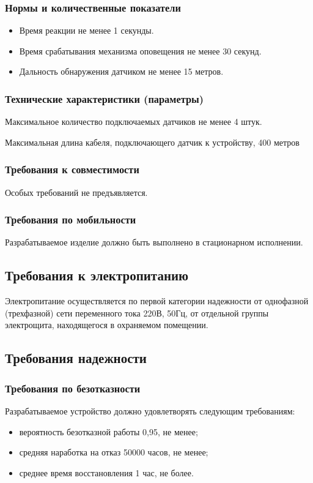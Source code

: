 			\subsubsection{Нормы и количественные показатели}
				\begin{itemize}
					\item Время реакции не менее 1 секунды.
					\item Время срабатывания механизма оповещения не менее 30 секунд.
					\item Дальность обнаружения датчиком не менее 15 метров.
				\end{itemize}
			\subsubsection{Технические характеристики (параметры)}
				Максимальное количество подключаемых датчиков не менее 4 штук.

				Максимальная длина кабеля, подключающего датчик к устройству, 400 метров
			\subsubsection{Требования к совместимости}
				Особых требований не предъявляется.

			\subsubsection{Требования по мобильности}
				Разрабатываемое изделие должно быть выполнено в стационарном исполнении.
		\subsection{Требования к электропитанию}
			Электропитание осуществляется по первой категории надежности от однофазной (трехфазной) сети переменного тока 220В, 50Гц, от отдельной группы электрощита, находящегося в охраняемом помещении.
		\subsection{Требования надежности}
			\subsubsection{Требования по безотказности}
				Разрабатываемое устройство должно удовлетворять следующим требованиям:
				\begin{itemize}
					\item вероятность безотказной работы 0,95, не менее;
					\item средняя наработка на отказ 50000 часов, не менее;
					\item среднее время восстановления 1 час, не более.
				\end{itemize}
